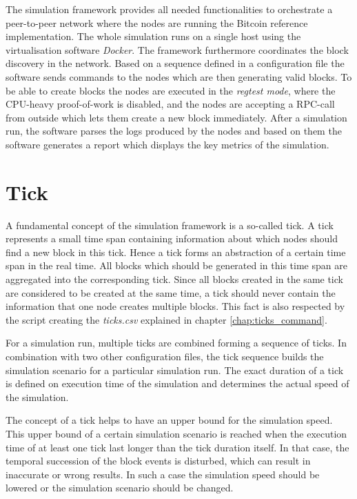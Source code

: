 The simulation framework provides all needed functionalities to orchestrate a peer-to-peer network where the nodes are running the Bitcoin reference implementation.
The whole simulation runs on a single host using the virtualisation software \textit{Docker}.
The framework furthermore coordinates the block discovery in the network.
Based on a sequence defined in a configuration file the software sends commands to the nodes which are then generating valid blocks.
To be able to create blocks the nodes are executed in the \textit{regtest mode}, where the CPU-heavy proof-of-work is disabled, and the nodes are accepting a RPC-call from outside which lets them create a new block immediately.
After a simulation run, the software parses the logs produced by the nodes and based on them the software generates a report which displays the key metrics of the simulation.

\section{Tick}
\label{chap:tick}

A fundamental concept of the simulation framework is a so-called tick.
A tick represents a small time span containing information about which nodes should find a new block in this tick.
Hence a tick forms an abstraction of a certain time span in the real time.
All blocks which should be generated in this time span are aggregated into the corresponding tick.
Since all blocks created in the same tick are considered to be created at the same time, a tick should never contain the information that one node creates multiple blocks.
This fact is also respected by the script creating the \textit{ticks.csv} explained in chapter \ref{chap:ticks_command}.

For a simulation run, multiple ticks are combined forming a sequence of ticks.
In combination with two other configuration files, the tick sequence builds the simulation scenario for a particular simulation run.
The exact duration of a tick is defined on execution time of the simulation and determines the actual speed of the simulation.

The concept of a tick helps to have an upper bound for the simulation speed.
This upper bound of a certain simulation scenario is reached when the execution time of at least one tick last longer than the tick duration itself.
In that case, the temporal succession of the block events is disturbed, which can result in inaccurate or wrong results.
In such a case the simulation speed should be lowered or the simulation scenario should be changed.

